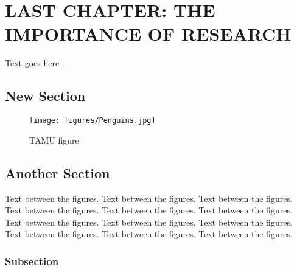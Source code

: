 %
%
%



\chapter{\uppercase{Last Chapter: The Importance of Research}}

Text goes here \cite{Agrawal1986}.

\section{New Section}

\begin{figure}[H]
\centering
\texttt{[image: figures/Penguins.jpg]}
\caption{TAMU figure}
\label{fig:tamu-fig3}
\end{figure}
\section{Another Section}

Text between the figures.  Text between the figures. Text between the figures. Text between the figures.  Text between the figures. Text between the figures. Text between the figures.  Text between the figures. Text between the figures. Text between the figures.  Text between the figures. Text between the figures.

\subsection{Subsection}

